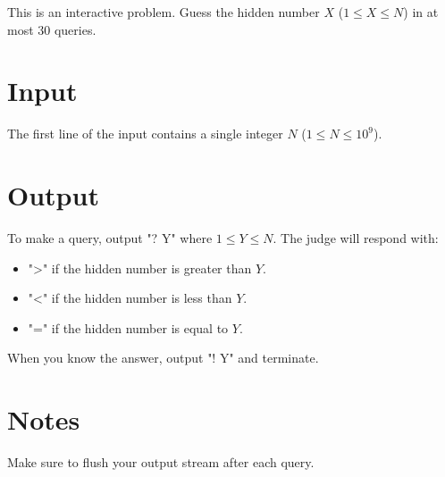 
This is an interactive problem.
Guess the hidden number $X$ ($1 \le X \le N$) in at most 30 queries.

\section*{Input}
The first line of the input contains a single integer $N$ ($1 \le N \le 10^9$).

\section*{Output}
To make a query, output "? Y" where $1 \le Y \le N$. The judge will respond with:
\begin{itemize}
    \item ">" if the hidden number is greater than $Y$.
    \item "<" if the hidden number is less than $Y$.
    \item "=" if the hidden number is equal to $Y$.
\end{itemize}

When you know the answer, output "! Y" and terminate.

\section*{Notes}
Make sure to flush your output stream after each query.
